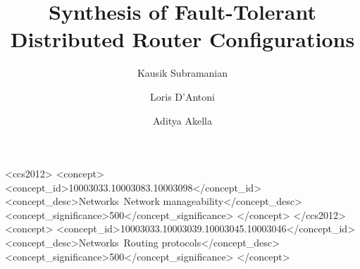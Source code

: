 \documentclass[sigconf]{acmart}
\begin{document}
\title{Synthesis of Fault-Tolerant Distributed Router Configurations}

\author{Kausik Subramanian}

\author{Loris D'Antoni}

\author{Aditya Akella}

\fancyhead{}
\renewcommand{\shortauthors}{K. Subramanian et al.}




%
%
\begin{CCSXML}
<ccs2012>
<concept>
<concept_id>10003033.10003083.10003098</concept_id>
<concept_desc>Networks~Network manageability</concept_desc>
<concept_significance>500</concept_significance>
</concept>
</ccs2012>
<concept>
<concept_id>10003033.10003039.10003045.10003046</concept_id>
<concept_desc>Networks~Routing protocols</concept_desc>
<concept_significance>500</concept_significance>
</concept>
\end{CCSXML}





\maketitle
\end{document}
